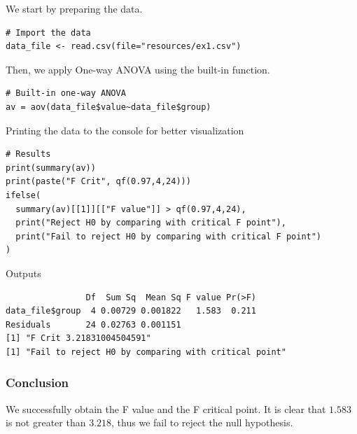 \documentclass[a4paper]{article}
\numberwithin{equation}{section}
\begin{document}
We start by preparing the data.
\begin{mdframed}[leftline=false,rightline=false,backgroundcolor=magenta!10,nobreak=true]
  \begin{verbatim}
# Import the data
data_file <- read.csv(file="resources/ex1.csv")
  \end{verbatim}
\end{mdframed}

Then, we apply One-way ANOVA using the built-in function.
\begin{mdframed}[leftline=false,rightline=false,backgroundcolor=magenta!10,nobreak=true]
  \begin{verbatim}
# Built-in one-way ANOVA
av = aov(data_file$value~data_file$group)
  \end{verbatim}
\end{mdframed}

Printing the data to the console for better visualization
\begin{mdframed}[leftline=false,rightline=false,backgroundcolor=magenta!10,nobreak=true]
  \begin{verbatim}
# Results
print(summary(av))
print(paste("F Crit", qf(0.97,4,24)))
ifelse(
  summary(av)[[1]][["F value"]] > qf(0.97,4,24),
  print("Reject H0 by comparing with critical F point"),
  print("Fail to reject H0 by comparing with critical F point")
)
  \end{verbatim}
\end{mdframed}

Outputs
\begin{mdframed}[leftline=false,rightline=false,backgroundcolor=magenta!10,nobreak=true]
  \begin{verbatim}
                Df  Sum Sq  Mean Sq F value Pr(>F)
data_file$group  4 0.00729 0.001822   1.583  0.211
Residuals       24 0.02763 0.001151
[1] "F Crit 3.21831004504591"
[1] "Fail to reject H0 by comparing with critical point"
  \end{verbatim}
\end{mdframed}

\subsubsection{Conclusion}
We successfully obtain the F value and the F critical point.
It is clear that \(1.583\) is not greater than \(3.218\), thus we fail to reject the null hypothesis.
\end{document}
